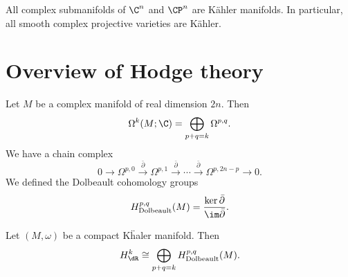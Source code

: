 \documentclass[a4paper]{article}
\newcommand\Dolb{\mathrm{Dolbeault}}
\begin{document}
\begin{eg}
  All complex submanifolds of $\C^n$ and $\CP^n$ are K\"ahler manifolds. In particular, all smooth complex projective varieties are K\"ahler.
\end{eg}

\section{Overview of Hodge theory}
Let $M$ be a complex manifold of real dimension $2n$. Then
\[
  \Omega^k(M; \C) = \bigoplus_{p + q = k} \Omega^{p, q}.
\]
We have a chain complex
\[
  0 \to \Omega^{p, 0} \overset{\bar{\partial}}{\to} \Omega^{p, 1} \overset{\bar{\partial}}{\to} \cdots \overset{\bar{\partial}}{\to} \Omega^{p, 2n - p} \to 0.
\]
We defined the Dolbeault cohomology groups
\[
  H_{\Dolb}^{p, q}(M) = \frac{\ker \bar{\partial}}{\im \bar{\partial}}.
\]
\begin{thm}
  Let $(M, \omega)$ be a compact K\"haler manifold. Then
  \[
    H^k_{\dR} \cong \bigoplus_{p + q = k} H^{p, q}_{\Dolb}(M).
  \]
\end{thm}
\end{document}
